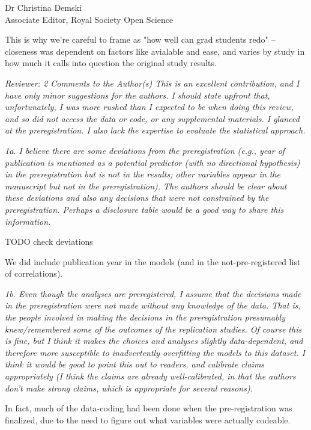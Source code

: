 \documentclass{stanfordletter}
\newcommand{\theysaid}[1]{\begin{leftbar} \noindent 
		\textsl{ #1}\end{leftbar}}
\begin{document}
\begin{letter}{Dr Christina Demski \\ Associate Editor, Royal Society Open Science}
          
          This is why we're careful to frame as "how well can grad students redo" -- closeness was dependent on factors like avialable and ease, and varies by study in how much it calls into question the original study results. 
          
          \theysaid{Reviewer: 2
          	Comments to the Author(s)
          	This is an excellent contribution, and I have only minor suggestions for the authors. I should state upfront that, unfortunately, I was more rushed than I expected to be when doing this review, and so did not access the data or code, or any supplemental materials.  I glanced at the preregistration.  I also lack the expertise to evaluate the statistical approach.
          }
          	
          \theysaid{	1a. I believe there are some deviations from the preregistration (e.g., year of publication is mentioned as a potential predictor (with no directional hypothesis) in the preregistration but is not in the results; other variables appear in the manuscript but not in the preregistration). The authors should be clear about these deviations and also any decisions that were not constrained by the preregistration. Perhaps a disclosure table would be a good way to share this information.}
          
          TODO check deviations
          
          We did include publication year in the models (and in the not-pre-registered list of correlations). 
          
          
          \theysaid{
          	1b. Even though the analyses are preregistered, I assume that the decisions made in the preregistration were not made without any knowledge of the data.  That is, the people involved in making the decisions in the preregistration presumably knew/remembered some of the outcomes of the replication studies.  Of course this is fine, but I think it makes the choices and analyses slightly data-dependent, and therefore more susceptible to inadvertently overfitting the models to this dataset. I think it would be good to point this out to readers, and calibrate claims appropriately (I think the claims are already well-calibrated, in that the authors don't make strong claims, which is appropriate for several reasons).
          }
          
          In fact, much of the data-coding had been done when the pre-registration was finalized, due to the need to figure out what variables were actually codeable. 
          

\end{letter}
\end{document}
